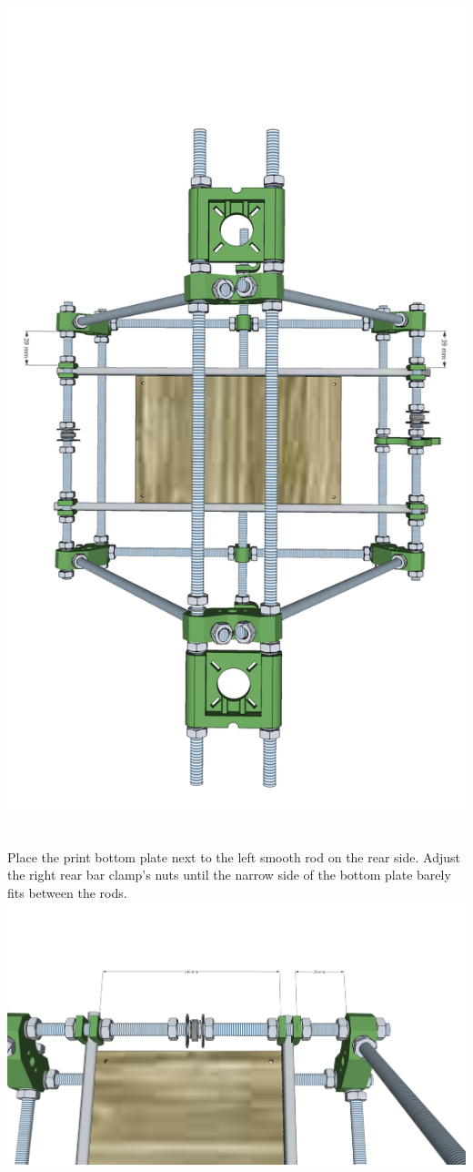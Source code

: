 \documentclass[twoside,a4paper,titlepage]{memoir}
\begin{document}
	\includegraphics[width=1\linewidth]{graphics/ch6_7_2.png}
	
	\section{}
	Place the print bottom plate next to the left smooth rod on the rear side. Adjust the right rear bar clamp's
	nuts until the narrow side of the bottom plate barely fits between the rods.\\
	\includegraphics[width=1\linewidth]{graphics/ch6_8.png}
	
\end{document}
